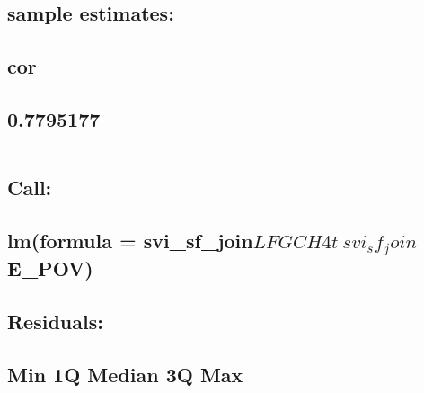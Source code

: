 \documentclass[
  12pt,
]{article}
\begin{document}
\hypertarget{sample-estimates-6}{%
\subsection{sample estimates:}\label{sample-estimates-6}}

\hypertarget{cor-6}{%
\subsection{cor}\label{cor-6}}

\hypertarget{section-63}{%
\subsection{0.7795177}\label{section-63}}

\begin{verbatim}
\end{verbatim}

\hypertarget{section-64}{%
\subsection{}\label{section-64}}

\hypertarget{call-6}{%
\subsection{Call:}\label{call-6}}

\hypertarget{lmformula-svi_sf_joinlfgch4t-svi_sf_joine_pov}{%
\subsection{\texorpdfstring{lm(formula =
svi\_sf\_join\(LFGCH4t ~ svi_sf_join\)E\_POV)}{lm(formula = svi\_sf\_joinLFGCH4t \textasciitilde{} svi\_sf\_joinE\_POV)}}\label{lmformula-svi_sf_joinlfgch4t-svi_sf_joine_pov}}

\hypertarget{section-65}{%
\subsection{}\label{section-65}}

\hypertarget{residuals-6}{%
\subsection{Residuals:}\label{residuals-6}}

\hypertarget{min-1q-median-3q-max-6}{%
\subsection{Min 1Q Median 3Q Max}\label{min-1q-median-3q-max-6}}
\end{document}
